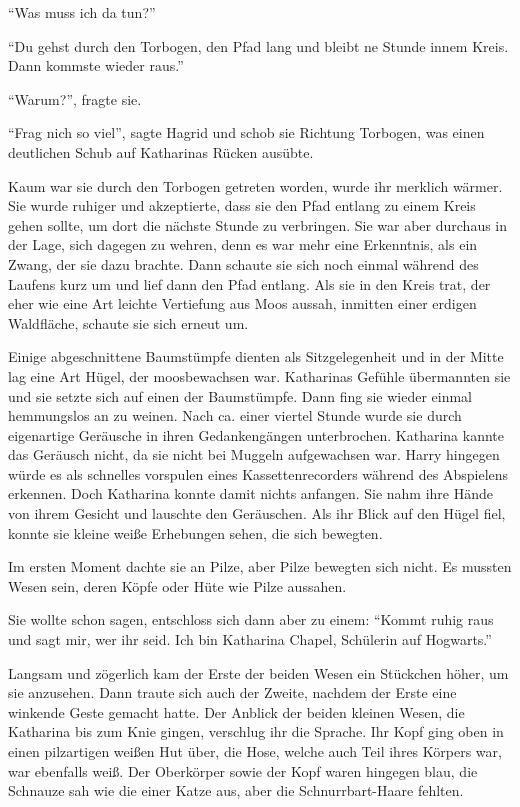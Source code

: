 \enquote{Was muss ich da tun?}

\enquote{Du gehst durch den Torbogen, den Pfad lang und bleibt ne Stunde innem Kreis. Dann kommste wieder raus.}

\enquote{Warum?}, fragte sie.

\enquote{Frag nich so viel}, sagte Hagrid und schob sie Richtung Torbogen, was einen deutlichen Schub auf Katharinas Rücken ausübte.

Kaum war sie durch den Torbogen getreten worden, wurde ihr merklich wärmer. Sie wurde ruhiger und akzeptierte, dass sie den Pfad entlang zu einem Kreis gehen sollte, um dort die nächste Stunde zu verbringen. Sie war aber durchaus in der Lage, sich dagegen zu wehren, denn es war mehr eine Erkenntnis, als ein Zwang, der sie dazu brachte. Dann schaute sie sich noch einmal während des Laufens kurz um und lief dann den Pfad entlang. Als sie in den Kreis trat, der eher wie eine Art leichte Vertiefung aus Moos aussah, inmitten einer erdigen Waldfläche, schaute sie sich erneut um.

Einige abgeschnittene Baumstümpfe dienten als Sitzgelegenheit und in der Mitte lag eine Art Hügel, der moosbewachsen war. Katharinas Gefühle übermannten sie und sie setzte sich auf einen der Baumstümpfe. Dann fing sie wieder einmal hemmungslos an zu weinen. Nach ca. einer viertel Stunde wurde sie durch eigenartige Geräusche in ihren Gedankengängen unterbrochen. Katharina kannte das Geräusch nicht, da sie nicht bei Muggeln aufgewachsen war. Harry hingegen würde es als schnelles vorspulen eines Kassettenrecorders während des Abspielens erkennen. Doch Katharina konnte damit nichts anfangen. Sie nahm ihre Hände von ihrem Gesicht und lauschte den Geräuschen. Als ihr Blick auf den Hügel fiel, konnte sie kleine weiße Erhebungen sehen, die sich bewegten.

Im ersten Moment dachte sie an Pilze, \gst aber Pilze bewegten sich nicht. Es mussten Wesen sein, deren Köpfe \gst oder Hüte \gst wie Pilze aussahen.

Sie wollte schon  sagen, entschloss sich dann aber zu einem: \enquote{Kommt ruhig raus und sagt mir, wer ihr seid. Ich bin Katharina Chapel, Schülerin auf Hogwarts.}

Langsam und zögerlich kam der Erste der beiden Wesen ein Stückchen höher, um sie anzusehen. Dann traute sich auch der Zweite, nachdem der Erste eine winkende Geste gemacht hatte. Der Anblick der beiden kleinen Wesen, die Katharina bis zum Knie gingen, verschlug ihr die Sprache. Ihr Kopf ging oben in einen pilzartigen weißen Hut über, die Hose, welche auch Teil ihres Körpers war, war ebenfalls weiß. Der Oberkörper sowie der Kopf waren hingegen blau, die Schnauze sah wie die einer Katze aus, aber die Schnurrbart-Haare fehlten.

